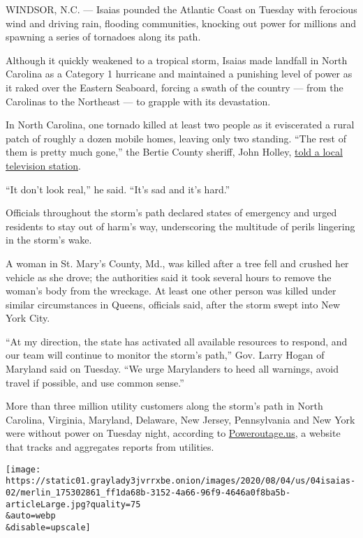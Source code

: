 WINDSOR, N.C. --- Isaias pounded the Atlantic Coast on Tuesday with
ferocious wind and driving rain, flooding communities, knocking out
power for millions and spawning a series of tornadoes along its path.

Although it quickly weakened to a tropical storm, Isaias made landfall
in North Carolina as a Category 1 hurricane and maintained a punishing
level of power as it raked over the Eastern Seaboard, forcing a swath of
the country --- from the Carolinas to the Northeast --- to grapple with
its devastation.

In North Carolina, one tornado killed at least two people as it
eviscerated a rural patch of roughly a dozen mobile homes, leaving only
two standing. ``The rest of them is pretty much gone,'' the Bertie
County sheriff, John Holley,
\href{https://www.13newsnow.com/video/news/local/north-carolina/bertie-county-sheriff-john-holley-talks-about-fatality-in-north-carolina/291-99306d30-d640-4e9a-97fa-0221d565f5df}{told
a local television station}.

``It don't look real,'' he said. ``It's sad and it's hard.''

Officials throughout the storm's path declared states of emergency and
urged residents to stay out of harm's way, underscoring the multitude of
perils lingering in the storm's wake.

A woman in St. Mary's County, Md., was killed after a tree fell and
crushed her vehicle as she drove; the authorities said it took several
hours to remove the woman's body from the wreckage. At least one other
person was killed under similar circumstances in Queens, officials said,
after the storm swept into New York City.

``At my direction, the state has activated all available resources to
respond, and our team will continue to monitor the storm's path,'' Gov.
Larry Hogan of Maryland said on Tuesday. ``We urge Marylanders to heed
all warnings, avoid travel if possible, and use common sense.''

More than three million utility customers along the storm's path in
North Carolina, Virginia, Maryland, Delaware, New Jersey, Pennsylvania
and New York were without power on Tuesday night, according to
\href{https://poweroutage.us/}{Poweroutage.us}, a website that tracks
and aggregates reports from utilities.

\texttt{[image: https://static01.graylady3jvrrxbe.onion/images/2020/08/04/us/04isaias-02/merlin\_175302861\_ff1da68b-3152-4a66-96f9-4646a0f8ba5b-articleLarge.jpg?quality=75\\\&auto=webp\\\&disable=upscale]}

